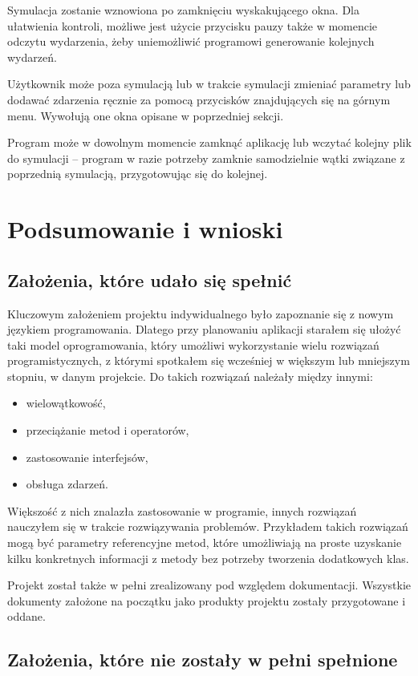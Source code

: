 \documentclass[a4paper,12pt]{article}
\newcommand\tab[1][0.6cm]{\hspace*{#1} }
\begin{document}
\tab Symulacja zostanie wznowiona po zamknięciu wyskakującego okna. Dla ułatwienia kontroli, możliwe jest użycie przycisku pauzy także w momencie odczytu wydarzenia, żeby uniemożliwić programowi generowanie kolejnych wydarzeń.

Użytkownik może poza symulacją lub w trakcie symulacji zmieniać parametry lub dodawać zdarzenia ręcznie za pomocą przycisków znajdujących się na górnym menu. Wywołują one okna opisane w poprzedniej sekcji.

Program może w dowolnym momencie zamknąć aplikację lub wczytać kolejny plik do symulacji -- program w razie potrzeby zamknie samodzielnie wątki związane z poprzednią symulacją, przygotowując się do kolejnej.

\section{Podsumowanie i wnioski}

\subsection{Założenia, które udało się spełnić}

\tab Kluczowym założeniem projektu indywidualnego było zapoznanie się z nowym językiem programowania. Dlatego przy planowaniu aplikacji starałem się ułożyć taki model oprogramowania, który umożliwi wykorzystanie wielu rozwiązań programistycznych, z którymi spotkałem się wcześniej w większym lub mniejszym stopniu, w danym projekcie. Do takich rozwiązań należały między innymi:
\begin{itemize}
\item wielowątkowość,
\item przeciążanie metod i operatorów,
\item zastosowanie interfejsów,
\item obsługa zdarzeń.
\end{itemize}
\tab Większość z nich znalazła zastosowanie w programie, innych rozwiązań nauczyłem się w trakcie rozwiązywania problemów. Przykładem takich rozwiązań mogą być parametry referencyjne metod, które umożliwiają na proste uzyskanie kilku konkretnych informacji z metody bez potrzeby tworzenia dodatkowych klas.

\tab Projekt został także w pełni zrealizowany pod względem dokumentacji. Wszystkie dokumenty założone na początku jako produkty projektu zostały przygotowane i oddane. 

\subsection{Założenia, które nie zostały w pełni spełnione}
\end{document}
